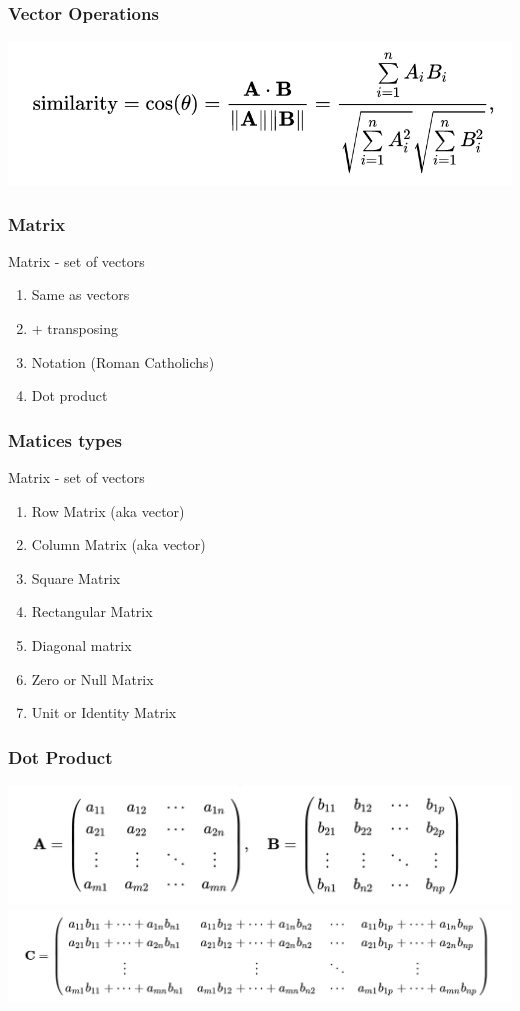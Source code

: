 \documentclass[t, 11pt]{beamer}
\begin{document}
	\begin{frame} 
		\frametitle{\insertsection} 
		\frametitle{Vector Operations} 
		\includegraphics[scale=0.7]{cos}	
	\end{frame}	
	
	\begin{frame} 
		\frametitle{\insertsection} 
		\frametitle{Matrix} 
		Matrix - set of vectors  
		\begin{enumerate}
			\item Same as vectors
			\item + transposing
			\item Notation (Roman Catholichs)
			\item Dot product 
		\end{enumerate}
		
	\end{frame}
	
	\begin{frame} 
		\frametitle{\insertsection} 
		\frametitle{Matices types} 
		Matrix - set of vectors  
		\begin{enumerate}
			\item Row Matrix (aka vector)
			\item Column Matrix (aka vector)
			\item Square Matrix
			\item Rectangular Matrix
			\item Diagonal matrix
			\item Zero or Null Matrix
			\item Unit or Identity Matrix
		\end{enumerate}
	\end{frame}
	
	\begin{frame} 
		\frametitle{\insertsection} 
		\frametitle{Dot  Product} 
		\includegraphics[scale=0.6]{ABmat}	
		\includegraphics[scale=0.5]{Cmat}	
	\end{frame}	
	
\end{document}

